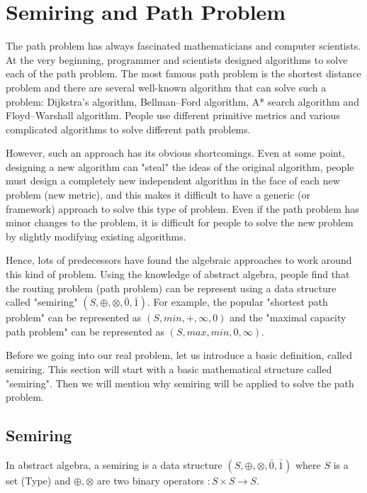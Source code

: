 \documentclass[a4paper,12pt,twoside,openright]{report}
\begin{document}
\section{Semiring and Path Problem}
The path problem has always fascinated mathematicians and computer scientists. 
At the very beginning, programmer and scientists designed algorithms to solve each of the path problem. 
The most famous path problem is the shortest distance problem and there are several well-known algorithm that can solve such a problem: Dijkstra's algorithm, Bellman–Ford algorithm, A* search algorithm and Floyd–Warshall algorithm. People use different primitive metrics and various complicated algorithms to solve different path problems.

However, such an approach has its obvious shortcomings. Even at some point, designing a new algorithm can "steal" the ideas of the original algorithm, people must design a completely new independent algorithm in the face of each new problem (new metric), and this makes it difficult to have a generic (or framework) approach to solve this type of problem.  Even if the path problem has minor changes to the problem, it is difficult for people to solve the new problem by slightly modifying existing algorithms. 

Hence, lots of predecessors have found the algebraic approaches to work around this kind of problem. 
Using the knowledge of abstract algebra, people find that the routing problem (path problem) can be represent using a data structure called "semiring" $(S,\oplus,\otimes,\bar{0},\bar{1})$\cite{carre_algebra_1971,WONGSEELASHOTE197955,dynerowicz_forwarding_2013,mohri_semiring_2002,gurney_lexicographic_2007}. For example, the popular "shortest path problem" can be represented as $(S, min,+,\infty,0)$\cite{mohri_semiring_2002} and the "maximal capacity path problem" can be represented as $(S, max,min, 0, \infty)$. 

Before we going into our real problem, let us introduce a basic definition, called semiring. This section will start with a basic mathematical structure called "semiring". Then we will mention why semiring will be applied to solve the path problem. 
\subsection{Semiring}
In abstract algebra, a semiring is a data structure $(S,\oplus,\otimes,\bar0,\bar1)$ where $S$ is a set (Type) and $\oplus,\otimes$ are two binary operators $:S\times S \rightarrow S$.
\end{document}
